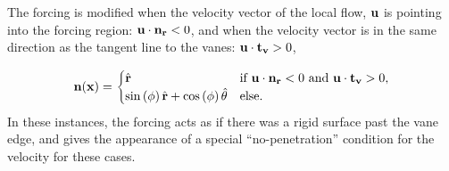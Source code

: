 

The forcing is modified when the velocity vector of the local flow, ${\bf u}$ 
is pointing into the forcing region: ${\bf u} \cdot {\bf n_r} < 0$, and
when the velocity vector is in the same direction as the tangent line to
the vanes: $ {\bf u} \cdot {\bf t_v} > 0 $, 

\begin{equation}
 {\bf n}({\bf x}) = 
 \begin{cases} 
   \hat {\bf r}  & \text{if } {\bf u} \cdot {\bf n_r} < 0 \text{ and }  {\bf u} \cdot {\bf t_v} > 0  ,\\
   \sin \left(\phi \right) \hat{{\bf r}}+ \cos \left(\phi \right) \hat{{\bf \theta}}  & \text{else}.
 \end{cases}
\end{equation}
%
In these instances, the
forcing acts as if there was a rigid surface past the vane edge, and
gives the appearance of a special ``no-penetration'' condition for the
velocity for these cases. 

